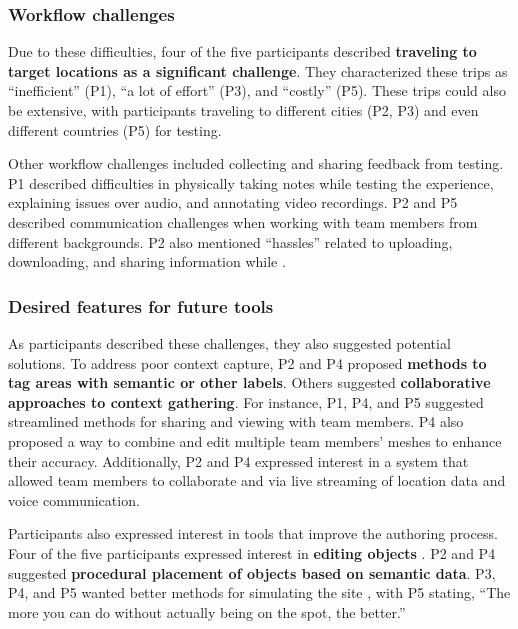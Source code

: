 \subsubsection{Workflow challenges}
Due to these difficulties, four of the five participants described \textbf{traveling to target locations as a significant challenge}. They characterized these trips as ``inefficient'' (P1), ``a lot of effort'' (P3), and ``costly'' (P5). These trips could also be extensive, with participants traveling to different cities (P2, P3) and even different countries (P5) for testing.

Other workflow challenges included collecting and sharing feedback from \insitu testing. P1 described difficulties in physically taking notes while testing the experience, explaining issues over audio, and annotating video recordings. P2 and P5 described communication challenges when working with team members from different backgrounds. P2 also mentioned ``hassles'' related to uploading, downloading, and sharing information while \insitu[ ].

\subsubsection{Desired features for future tools}
As participants described these challenges, they also suggested potential solutions. To address poor context capture, P2 and P4 proposed \textbf{methods to tag areas with semantic or other labels}. Others suggested \textbf{collaborative approaches to context gathering}. For instance, P1, P4, and P5 suggested streamlined methods for sharing and viewing \locMeshes with team members. P4 also proposed a way to combine and edit multiple team members' meshes to enhance their accuracy. Additionally, P2 and P4 expressed interest in a system that allowed team members to collaborate \insitu[ ] and \exsitu[ ] via live streaming of location data and voice communication.

Participants also expressed interest in tools that improve the authoring process. Four of the five participants expressed interest in \textbf{editing objects \insitu[ ]}. P2 and P4 suggested \textbf{procedural placement of objects based on semantic data}. P3, P4, and P5 wanted better methods for simulating the site \exsitu[ ], with P5 stating, ``The more you can do without actually being on the spot, the better.''
